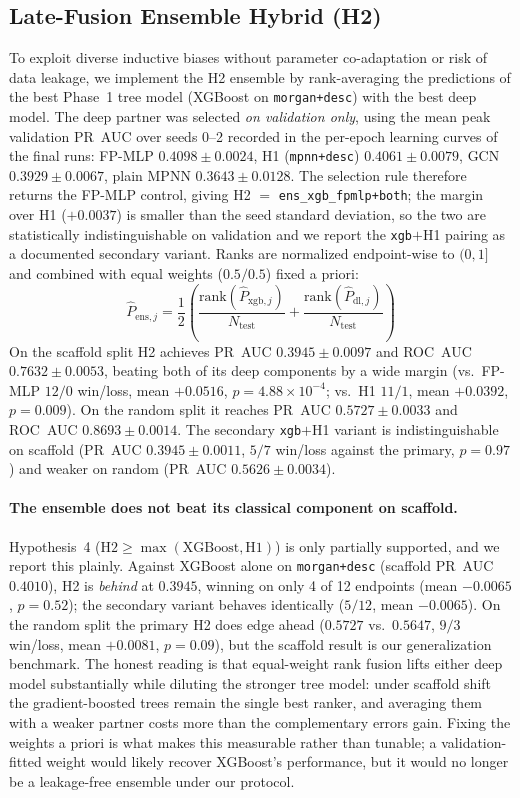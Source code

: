 \subsection{Late-Fusion Ensemble Hybrid (H2)}
To exploit diverse inductive biases without parameter co-adaptation or risk of data leakage, we implement the H2 ensemble by rank-averaging the predictions of the best Phase~1 tree model (XGBoost on \texttt{morgan+desc}) with the best deep model. The deep partner was selected \emph{on validation only}, using the mean peak validation PR~AUC over seeds 0--2 recorded in the per-epoch learning curves of the final runs: FP-MLP $0.4098 \pm 0.0024$, H1 (\texttt{mpnn+desc}) $0.4061 \pm 0.0079$, GCN $0.3929 \pm 0.0067$, plain MPNN $0.3643 \pm 0.0128$. The selection rule therefore returns the FP-MLP control, giving H2 $=$ \texttt{ens\_xgb\_fpmlp+both}; the margin over H1 ($+0.0037$) is smaller than the seed standard deviation, so the two are statistically indistinguishable on validation and we report the \texttt{xgb}$+$H1 pairing as a documented secondary variant. Ranks are normalized endpoint-wise to $(0, 1]$ and combined with equal weights ($0.5/0.5$) fixed a priori:
\begin{equation}
\hat{P}_{\text{ens}, j} = \frac{1}{2} \left( \frac{\text{rank}(\hat{P}_{\text{xgb}, j})}{N_{\text{test}}} + \frac{\text{rank}(\hat{P}_{\text{dl}, j})}{N_{\text{test}}} \right)
\end{equation}
On the scaffold split H2 achieves PR~AUC $0.3945 \pm 0.0097$ and ROC~AUC $0.7632 \pm 0.0053$, beating both of its deep components by a wide margin (vs.\ FP-MLP $12/0$ win/loss, mean $+0.0516$, $p = 4.88 \times 10^{-4}$; vs.\ H1 $11/1$, mean $+0.0392$, $p = 0.009$). On the random split it reaches PR~AUC $0.5727 \pm 0.0033$ and ROC~AUC $0.8693 \pm 0.0014$. The secondary \texttt{xgb}$+$H1 variant is indistinguishable on scaffold (PR~AUC $0.3945 \pm 0.0011$, $5/7$ win/loss against the primary, $p = 0.97$) and weaker on random (PR~AUC $0.5626 \pm 0.0034$).

\paragraph{The ensemble does not beat its classical component on scaffold.} Hypothesis~4 ($\text{H2} \geq \max(\text{XGBoost}, \text{H1})$) is only partially supported, and we report this plainly. Against XGBoost alone on \texttt{morgan+desc} (scaffold PR~AUC $0.4010$), H2 is \emph{behind} at $0.3945$, winning on only 4 of 12 endpoints (mean $-0.0065$, $p = 0.52$); the secondary variant behaves identically ($5/12$, mean $-0.0065$). On the random split the primary H2 does edge ahead ($0.5727$ vs.\ $0.5647$, $9/3$ win/loss, mean $+0.0081$, $p = 0.09$), but the scaffold result is our generalization benchmark. The honest reading is that equal-weight rank fusion lifts either deep model substantially while diluting the stronger tree model: under scaffold shift the gradient-boosted trees remain the single best ranker, and averaging them with a weaker partner costs more than the complementary errors gain. Fixing the weights a priori is what makes this measurable rather than tunable; a validation-fitted weight would likely recover XGBoost's performance, but it would no longer be a leakage-free ensemble under our protocol.

